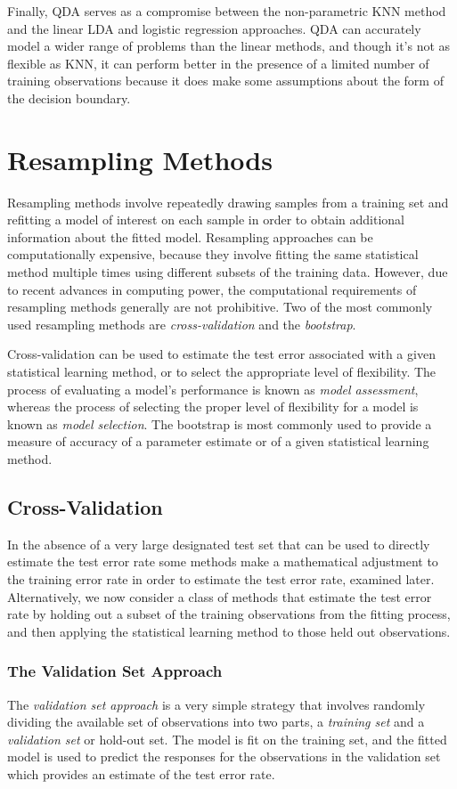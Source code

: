 \documentclass{article}
\numberwithin{equation}{section}
\begin{document}
\begin{enumerate}
Finally, QDA serves as a compromise between the non-parametric KNN method and the linear LDA and logistic regression approaches. QDA can accurately model a wider range of problems than the linear methods, and though it's not as flexible as KNN, it can perform better in the presence of a limited number of training observations because it does make some assumptions about the form of the decision boundary.

\newpage
\section{Resampling Methods}
Resampling methods involve repeatedly drawing samples from a training set and refitting a model of interest on each sample in order to obtain additional information about the fitted model. Resampling approaches can be computationally expensive, because they involve fitting the same statistical method multiple times using different subsets of the training data. However, due to recent advances in computing power, the computational requirements of resampling methods generally are not prohibitive. Two of the most commonly used resampling methods are \textit{cross-validation} and the \textit{bootstrap}.

Cross-validation can be used to estimate the test error associated with a given statistical learning method, or to select the appropriate level of flexibility. The process of evaluating a model’s performance is known as \textit{model assessment}, whereas the process of selecting the proper level of flexibility for a model is known as \textit{model selection}. The bootstrap is most commonly used to provide a measure of accuracy of a parameter estimate or of a given statistical learning method.

\subsection{Cross-Validation}
In the absence of a very large designated test set that can be used to directly estimate the test error rate some methods make a mathematical adjustment to the training error rate in order to estimate the test error rate, examined later. Alternatively, we now consider a class of methods that estimate the test error rate by holding out a subset of the training observations from the fitting process, and then applying the statistical learning method to those held out observations.

\subsubsection{The Validation Set Approach}
The \textit{validation set approach}  is a very simple strategy that involves randomly dividing the available set of observations into two parts, a \textit{training set} and a \textit{validation set} or hold-out set. The model is fit on the training set, and the fitted model is used to predict the responses for the observations in the validation set which provides an estimate of the test error rate.


\end{enumerate}
\end{document}
